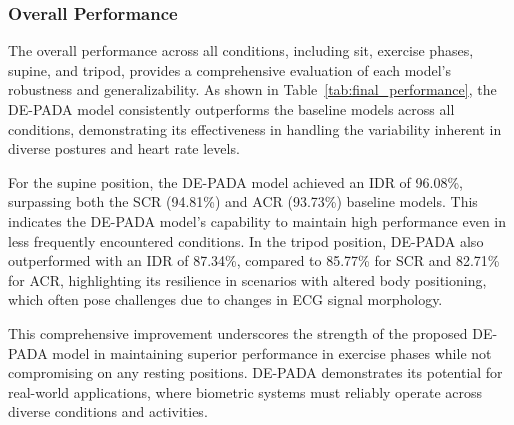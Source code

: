 \subsubsection{Overall Performance}
The overall performance across all conditions, including sit, exercise phases, supine, and tripod, provides a comprehensive evaluation of each model's robustness and generalizability. As shown in Table~\ref{tab:final_performance}, the DE-PADA model consistently outperforms the baseline models across all conditions, demonstrating its effectiveness in handling the variability inherent in diverse postures and heart rate levels.

For the supine position, the DE-PADA model achieved an IDR of 96.08\%, surpassing both the SCR (94.81\%) and ACR (93.73\%) baseline models. This indicates the DE-PADA model's capability to maintain high performance even in less frequently encountered conditions. In the tripod position, DE-PADA also outperformed with an IDR of 87.34\%, compared to 85.77\% for SCR and 82.71\% for ACR, highlighting its resilience in scenarios with altered body positioning, which often pose challenges due to changes in ECG signal morphology.

This comprehensive improvement underscores the strength of the proposed DE-PADA model in maintaining superior performance in exercise phases while not compromising on any resting positions. DE-PADA demonstrates its potential for real-world applications, where biometric systems must reliably operate across diverse conditions and activities.
\begin{table}[!t]
    \centering
    \caption{Overall IDR results for all the conditions.}
    \label{tab:final_performance}
\end{table}
